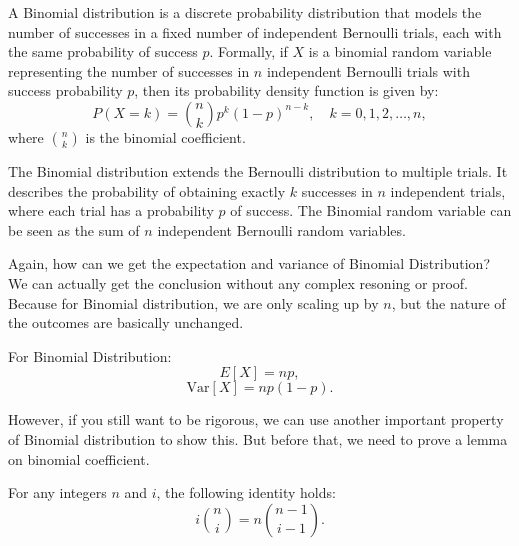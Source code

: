 \begin{definition}
    A Binomial distribution is a discrete probability distribution that models the number of successes in a fixed number of independent Bernoulli trials, each with the same probability of success \( p \). Formally, if \( X \) is a binomial random variable representing the number of successes in \( n \) independent Bernoulli trials with success probability \( p \), then its probability density function is given by:
    \[
    P(X = k) = \binom{n}{k} p^k (1-p)^{n-k}, \quad k = 0, 1, 2, \ldots, n,
    \]
    where \( \binom{n}{k} \) is the binomial coefficient.
\end{definition}

    The Binomial distribution extends the Bernoulli distribution to multiple trials. It describes the probability of obtaining exactly \( k \) successes in \( n \) independent trials, where each trial has a probability \( p \) of success. The Binomial random variable can be seen as the sum of \( n \) independent Bernoulli random variables.

    Again, how can we get the expectation and variance of Binomial Distribution? We can actually get the conclusion without any complex resoning or proof. Because for Binomial distribution, we are only scaling up by $n$, but the nature of the outcomes are basically unchanged.

\begin{theorem}
    For Binomial Distribution:
    \begin{equation}
    E[X] =  np,
\end{equation}
\begin{equation}
    \text{Var}[X] = np(1-p).
\end{equation}
\end{theorem}


However, if you still want to be rigorous, we can use another important property of Binomial distribution to show this. But before that, we need to prove a lemma on binomial coefficient.

\begin{lemma}
    For any integers \( n \) and \( i \), the following identity holds:
    \[
    i \binom{n}{i} = n \binom{n-1}{i-1}.
    \]
\end{lemma}

